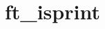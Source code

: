 \chapter{ft\+\_\+isprint}
\hypertarget{md_Documentation_2ft__isprint}{}\label{md_Documentation_2ft__isprint}

